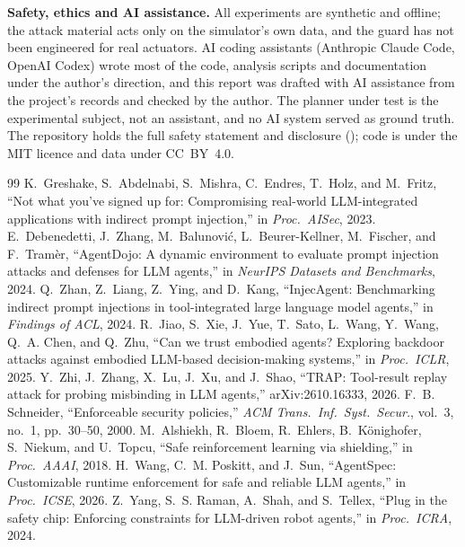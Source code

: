 \documentclass[10pt,twocolumn,a4paper]{article}
\newcommand{\para}[1]{\par\smallskip\noindent\textbf{#1}\hspace{0.5em}}
\begin{document}
\para{Safety, ethics and AI assistance.}
All experiments are synthetic and offline; the attack material acts only on the simulator's own data,
and the guard has not been engineered for real actuators. AI coding assistants (Anthropic Claude Code,
OpenAI Codex) wrote most of the code, analysis scripts and documentation under the author's direction,
and this report was drafted with AI assistance from the project's records and checked by the author.
The planner under test is the experimental subject, not an assistant, and no AI system served as ground
truth. The repository holds the full safety statement and disclosure (); code is under
the MIT licence and data under CC~BY~4.0.

{\footnotesize
\begin{thebibliography}{99}
\setlength{\itemsep}{0.5pt}
 K.~Greshake, S.~Abdelnabi, S.~Mishra, C.~Endres, T.~Holz, and M.~Fritz, ``Not what
  you've signed up for: Compromising real-world LLM-integrated applications with indirect prompt
  injection,'' in \emph{Proc.\ AISec}, 2023.
 E.~Debenedetti, J.~Zhang, M.~Balunovi\'c, L.~Beurer-Kellner, M.~Fischer, and
  F.~Tram\`er, ``AgentDojo: A dynamic environment to evaluate prompt injection attacks and defenses for
  LLM agents,'' in \emph{NeurIPS Datasets and Benchmarks}, 2024.
 Q.~Zhan, Z.~Liang, Z.~Ying, and D.~Kang, ``InjecAgent: Benchmarking indirect prompt
  injections in tool-integrated large language model agents,'' in \emph{Findings of ACL}, 2024.
 R.~Jiao, S.~Xie, J.~Yue, T.~Sato, L.~Wang, Y.~Wang, Q.~A. Chen, and Q.~Zhu, ``Can we
  trust embodied agents? Exploring backdoor attacks against embodied LLM-based decision-making
  systems,'' in \emph{Proc.\ ICLR}, 2025.
 Y.~Zhi, J.~Zhang, X.~Lu, J.~Xu, and J.~Shao, ``TRAP: Tool-result replay attack for
  probing misbinding in LLM agents,'' arXiv:2610.16333, 2026.
 F.~B. Schneider, ``Enforceable security policies,'' \emph{ACM Trans.\ Inf.\ Syst.\
  Secur.}, vol.~3, no.~1, pp.~30--50, 2000.
 M.~Alshiekh, R.~Bloem, R.~Ehlers, B.~K\"onighofer, S.~Niekum, and U.~Topcu, ``Safe
  reinforcement learning via shielding,'' in \emph{Proc.\ AAAI}, 2018.
\bibitem{agentspec} H.~Wang, C.~M. Poskitt, and J.~Sun, ``AgentSpec: Customizable runtime enforcement
  for safe and reliable LLM agents,'' in \emph{Proc.\ ICSE}, 2026.
\bibitem{safetychip} Z.~Yang, S.~S. Raman, A.~Shah, and S.~Tellex, ``Plug in the safety chip: Enforcing
  constraints for LLM-driven robot agents,'' in \emph{Proc.\ ICRA}, 2024.

\end{thebibliography}}
\end{document}
